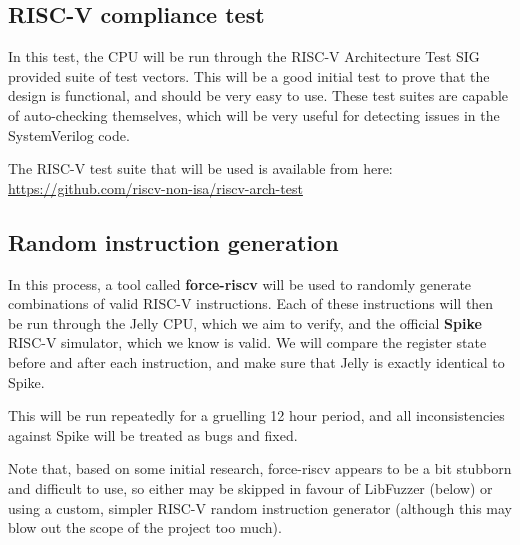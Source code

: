 \documentclass{article}
\begin{document}
\subsection{RISC-V compliance test}
In this test, the CPU will be run through the RISC-V Architecture Test SIG provided suite of test vectors.
This will be a good initial test to prove that the design is functional, and should be very easy to use.
These test suites are capable of auto-checking themselves, which will be very useful for detecting issues in
the SystemVerilog code.

The RISC-V test suite that will be used is available from here: \\
\url{https://github.com/riscv-non-isa/riscv-arch-test}

\subsection{Random instruction generation}
In this process, a tool called \textbf{force-riscv} will be used to randomly generate combinations of valid
RISC-V instructions. Each of these instructions will then be run through the Jelly CPU, which we aim to
verify, and the official \textbf{Spike} RISC-V simulator, which we know is valid. We will compare the
register state before and after each instruction, and make sure that Jelly is exactly identical to Spike.

This will be run repeatedly for a gruelling 12 hour period, and all inconsistencies against Spike will be
treated as bugs and fixed.

Note that, based on some initial research, force-riscv appears to be a bit stubborn and difficult to use, so
either may be skipped in favour of LibFuzzer (below) or using a custom, simpler RISC-V random instruction
generator (although this may blow out the scope of the project too much).

%
\end{document}

